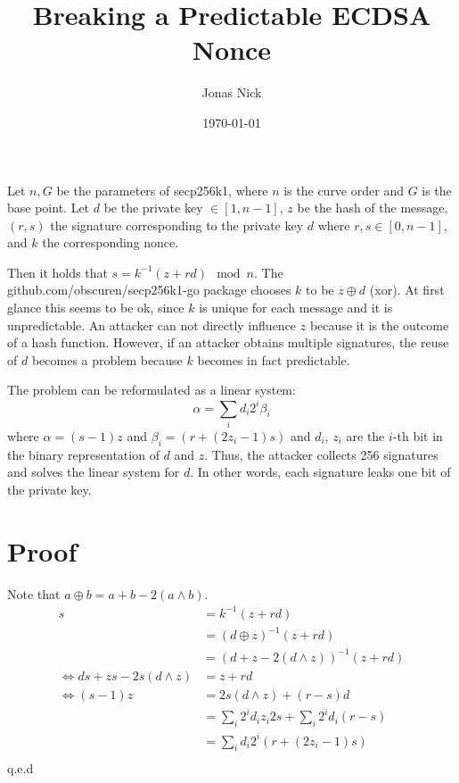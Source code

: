 \documentclass[11pt,a4paper,oneside]{article}
\title{Breaking a Predictable ECDSA Nonce}
\date{\today}
\author{Jonas Nick}
\begin{document}
\maketitle 
Let $n, G$ be the parameters of secp256k1, where $n$ is the curve order and $G$ is the base point.
Let $d$ be the private key $\in [1, n-1]$, $z$ be the hash of the message, $(r,s)$ the signature corresponding
to the private key $d$ where $r,s \in [0, n-1]$, and $k$ the corresponding nonce.

Then it holds that $s=k^{-1}(z+rd)\mod n$. The github.com/obscuren/secp256k1-go package chooses $k$ to be
$z\oplus d$ (xor). 
At first glance this seems to be ok, since $k$ is unique for each message and
it is unpredictable. An attacker can not directly influence $z$ because it is the outcome of a hash function.
However, if an attacker obtains multiple signatures, the reuse of $d$ becomes a problem because $k$ 
becomes in fact predictable. 

The problem can be reformulated as a linear system:
\begin{equation}
    \alpha = \sum_i d_i 2^i \beta_i
\end{equation}
where $\alpha = (s-1)z$ and $\beta_i = (r + (2z_i - 1)s)$ and $d_i$, $z_i$ are the $i$-th bit in the binary representation of $d$ and $z$.
Thus, the attacker collects 256 signatures and solves the linear system for $d$. 
In other words, each signature leaks one bit of the private key.

\section{Proof}

Note that $a \oplus b = a + b - 2(a\wedge b)$.
\begin{align*}
s&=k^{-1}(z+rd) \\
    &= (d\oplus z)^{-1}(z+rd)\\
    &= (d + z - 2(d\wedge z))^{-1}(z+rd)\\
    \iff ds + zs - 2s(d\wedge z)&= z + rd\\
    \iff (s-1)z &= 2s(d\wedge z)+(r-s)d\\
                &= \sum_i 2^i d_i z_i 2s + \sum_i 2^i d_i (r-s) \\
                &= \sum_i d_i 2^i (r + (2z_i - 1)s) \\
\end{align*}
q.e.d
\end{document}
